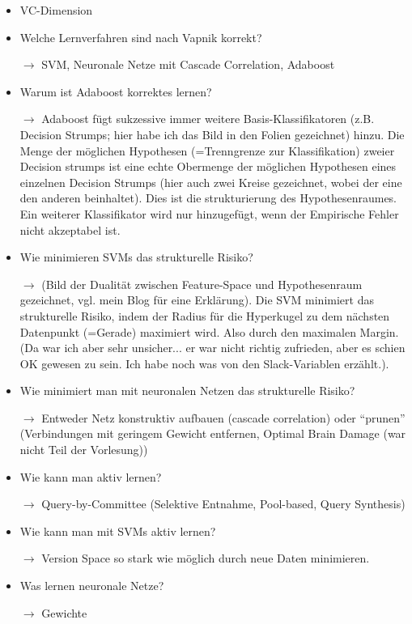 \documentclass[a4paper]{article}
\begin{document}
\begin{itemize}
    \item VC-Dimension
    \item Welche Lernverfahren sind nach Vapnik korrekt?
    \item[$\rightarrow$] SVM, Neuronale Netze mit Cascade Correlation, Adaboost
    \item Warum ist Adaboost korrektes lernen?
    \item[$\rightarrow$] Adaboost fügt sukzessive immer weitere Basis-Klassifikatoren (z.B. Decision Strumps; hier habe ich das Bild in den Folien
    gezeichnet) hinzu. Die Menge der möglichen Hypothesen (=Trenngrenze zur Klassifikation) zweier Decision
    strumps ist eine echte Obermenge der möglichen Hypothesen eines einzelnen
    Decision Strumps (hier auch zwei Kreise gezeichnet, wobei der eine den
    anderen beinhaltet). Dies ist die strukturierung des Hypothesenraumes.
    Ein weiterer Klassifikator wird nur hinzugefügt, wenn der Empirische Fehler
    nicht akzeptabel ist.
    \item Wie minimieren SVMs das strukturelle Risiko?
    \item[$\rightarrow$] (Bild der Dualität zwischen Feature-Space und Hypothesenraum gezeichnet, vgl. mein Blog für eine Erklärung). Die SVM
    minimiert das strukturelle Risiko, indem der Radius für die Hyperkugel zu
    dem nächsten Datenpunkt (=Gerade) maximiert wird. Also durch den maximalen
    Margin. (Da war ich aber sehr unsicher... er war nicht richtig zufrieden,
    aber es schien OK gewesen zu sein. Ich habe noch was von den Slack-Variablen
    erzählt.).
    \item Wie minimiert man mit neuronalen Netzen das strukturelle Risiko?
    \item[$\rightarrow$] Entweder Netz konstruktiv aufbauen (cascade correlation)
                         oder \enquote{prunen} (Verbindungen mit geringem Gewicht entfernen, Optimal Brain Damage (war nicht Teil der Vorlesung))
    \item Wie kann man aktiv lernen?
    \item[$\rightarrow$] Query-by-Committee (Selektive Entnahme, Pool-based, Query Synthesis)
    \item Wie kann man mit SVMs aktiv lernen?
    \item[$\rightarrow$] Version Space so stark wie möglich durch neue Daten
    minimieren.
    \item Was lernen neuronale Netze?
    \item[$\rightarrow$] Gewichte

\end{itemize}
\end{document}
